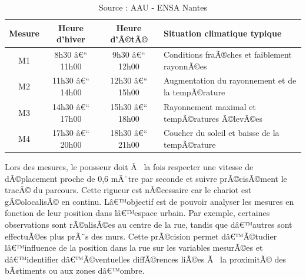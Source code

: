 \documentclass{article}
\begin{document}
\vspace{0.2cm}

\begin{table}[H]
\centering
\renewcommand{\arraystretch}{1.25}
\begin{tabularx}{\textwidth}{c c c X}
\toprule
\textbf{Mesure} & \textbf{Heure d'hiver} & \textbf{Heure d'Ã©tÃ©} & \textbf{Situation climatique typique} \\
\midrule
M1 & 8h30 â€“ 11h00 & 9h30 â€“ 12h00 & Conditions fraÃ®ches et faiblement rayonnÃ©es \\
M2 & 11h30 â€“ 14h00 & 12h30 â€“ 15h00 & Augmentation du rayonnement et de la tempÃ©rature \\
M3 & 14h30 â€“ 17h00 & 15h30 â€“ 18h00 & Rayonnement maximal et tempÃ©ratures Ã©levÃ©es \\
M4 & 17h30 â€“ 20h00 & 18h30 â€“ 21h00 & Coucher du soleil et baisse de la tempÃ©rature \\
\bottomrule
\end{tabularx}
\caption{Descriptif des mesures M1 Ã  M4.}
\vspace{-0.45cm}
\caption*{\footnotesize Source : AAU - ENSA Nantes}
\label{tab:mslot_horaires}
\end{table}

Lors des mesures, le pousseur doit Ã  la fois respecter une vitesse de dÃ©placement proche de 0,6 mÃ¨tre par seconde et suivre prÃ©cisÃ©ment le tracÃ© du parcours. Cette rigueur est nÃ©cessaire car le chariot est gÃ©olocalisÃ© en continu. Lâ€™objectif est de pouvoir analyser les mesures en fonction de leur position dans lâ€™espace urbain. Par exemple, certaines observations sont rÃ©alisÃ©es au centre de la rue, tandis que dâ€™autres sont effectuÃ©es plus prÃ¨s des murs. Cette prÃ©cision permet dâ€™Ã©tudier lâ€™influence de la position dans la rue sur les variables mesurÃ©es et dâ€™identifier dâ€™Ã©ventuelles diffÃ©rences liÃ©es Ã  la proximitÃ© des bÃ¢timents ou aux zones dâ€™ombre.
\end{document}
